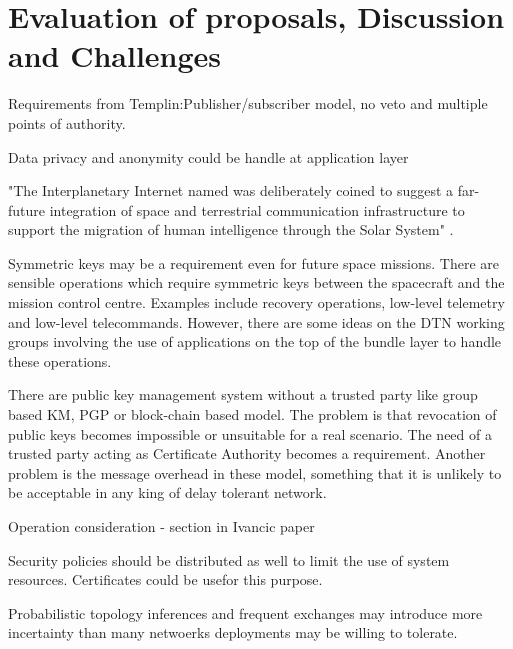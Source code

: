 
\section{Evaluation of proposals, Discussion and Challenges}
\label{sec:evaluation}

Requirements from Templin:Publisher/subscriber model, no veto and multiple points of authority. 

Data privacy and anonymity could be handle at application layer

"The Interplanetary Internet named was deliberately coined to suggest a far-future integration of space and terrestrial communication infrastructure to support the migration of human intelligence through the Solar System" \cite{burleigh2003interplanetary}. 


Symmetric keys may be a requirement even for future space missions. There are sensible operations which require symmetric keys between the spacecraft and the mission control centre. Examples include recovery operations, low-level telemetry and low-level telecommands.  However, there are some ideas on the DTN working groups involving the use of applications on the top of the bundle layer to handle these operations. 

There are public key management system without a trusted party like group based KM, PGP or block-chain based model. The problem is that revocation of public keys becomes impossible or unsuitable for a real scenario. The need of a trusted party acting as Certificate Authority becomes a requirement. Another problem is the message overhead in these model, something that it is unlikely to be acceptable in any king of delay tolerant network. 

Operation consideration - section in Ivancic paper

Security policies should be distributed as well to limit the use of system resources. Certificates could be usefor this purpose. 

Probabilistic topology inferences and frequent exchanges may introduce more incertainty than many netwoerks deployments may be willing to tolerate. 